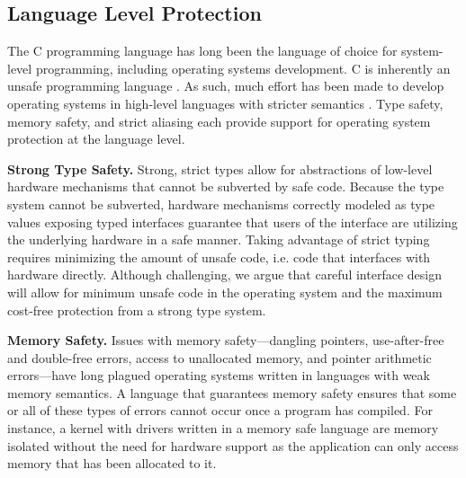 \subsection{Language Level Protection}

The C programming language has long been the language of choice for system-level
programming, including operating systems development. C is inherently an unsafe
programming language \cite{kint:osdi2012, undefined:apsys2012}. As such, much
effort has been made to develop operating systems in high-level languages with
stricter semantics \cite{singularity:sigops, house:icfp2005, unikernels:2013}.
Type safety, memory safety, and strict aliasing each provide support for
operating system protection at the language level.

\textbf{Strong Type Safety.}
Strong, strict types allow for abstractions of low-level hardware mechanisms
that cannot be subverted by safe code. Because the type system cannot be
subverted, hardware mechanisms correctly modeled as type values exposing typed interfaces
guarantee that users of the interface are utilizing the underlying hardware in a
safe manner.
Taking advantage of strict typing requires minimizing the amount of unsafe code,
i.e. code that interfaces with hardware directly.
Although challenging, we argue that careful interface design will allow
for minimum unsafe code in the operating system and the maximum cost-free
protection from a strong type system.

\textbf{Memory Safety.}
Issues with memory safety---dangling pointers, use-after-free and
double-free errors, access to unallocated memory, and pointer arithmetic
errors---have long plagued operating systems written in
languages with weak memory semantics.
A language that guarantees memory safety ensures that some or all of
these types of errors cannot occur once a program has compiled.
For instance, a kernel with drivers written in a memory safe language are
memory isolated without the need for hardware support as the
application can only access memory that has been allocated to it.

